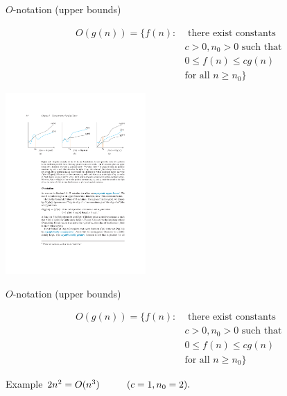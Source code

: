 \documentclass{beamer}
\begin{document}
\begin{frame}{$O$-notation (upper bounds)}
    \begin{tcolorbox}
        \vspace{-3mm}
        \begin{align*}
            O(g(n)) = \{ f(n):  & \text{ there exist constants } \\
                                                   & c > 0, n_0 > 0 \text{ such that } \\
                                                   & 0 \leq f(n) \leq cg(n) \\
                                                   & \text{for all } n \geq n_0\}
        \end{align*}
    \end{tcolorbox}
    \vspace{5mm}
    \centering
    \includegraphics[width=0.4\textwidth, trim={3.25cm 18.75cm 13.85cm 4.60cm}, clip]{figures/bigs}
\end{frame}

\begin{frame}{$O$-notation (upper bounds)}
    \begin{tcolorbox}
        \vspace{-3mm}
        \begin{align*}
            O(g(n)) = \{ f(n):  & \text{ there exist constants } \\
                                                   & c > 0, n_0 > 0 \text{ such that } \\
                                                   & 0 \leq f(n) \leq cg(n) \\
                                                   & \text{for all } n \geq n_0\}
        \end{align*}
    \end{tcolorbox}
    \begin{block}{Example}
        $2n^2 = O(n^3) \hspace{10mm} (c = 1, n_0 = 2).$
    \end{block}
\end{frame}
\end{document}
